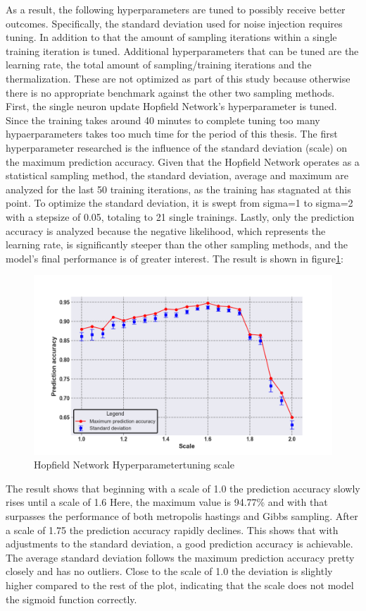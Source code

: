 As a result, the following hyperparameters are tuned to possibly receive better outcomes. 
Specifically, the standard deviation used for noise injection requires tuning.
In addition to that the amount of sampling iterations within a single training iteration is tuned.
Additional hyperparameters that can be tuned are the learning rate, the total amount of sampling/training iterations and the thermalization.
These are not optimized as part of this study because otherwise there is no appropriate benchmark against the other two 
sampling methods. 
First, the single neuron update Hopfield Network's hyperparameter is tuned. 
Since the training takes around 40 minutes to complete tuning too many hypaerparameters takes too much time for the period of this thesis. 
The first hyperparameter researched is the influence of the standard deviation (scale) on the maximum prediction accuracy. 
Given that the Hopfield Network operates as a statistical sampling method, the standard deviation, average and maximum are analyzed for the last 50 training iterations, as the training has stagnated at this point.
To optimize the standard deviation, it is swept from sigma=1 to sigma=2 with a stepsize of 0.05, totaling to 21 single trainings.
Lastly, only the prediction accuracy is analyzed because the negative likelihood, which represents the learning rate, is significantly steeper than the other sampling methods, and the model's final performance is of greater interest.
The result is shown in figure\ref{Hyperparamers_Scale_ohne}:
\begin{figure}[H]
    \centering
    \includegraphics[width=0.9\linewidth]{graphics/NEW_Scale_Ohne_N2_Half_Pred_Acc.png}
    \caption{Hopfield Network Hyperparametertuning scale}
    \label{Hyperparamers_Scale_ohne}
\end{figure}
The result shows that beginning with a scale of 1.0 the prediction accuracy slowly rises until a scale of 1.6
Here, the maximum value is 94.77\% and with that surpasses the performance of both metropolis hastings and Gibbs sampling. 
After a scale of 1.75 the prediction accuracy rapidly declines.
This shows that with adjustments to the standard deviation, a good prediction accuracy is achievable. 
The average standard deviation follows the maximum prediction accuracy pretty closely and has no outliers.
Close to the scale of 1.0 the deviation is slightly higher compared to the rest of the plot, indicating that the scale does not model the sigmoid function correctly. 

